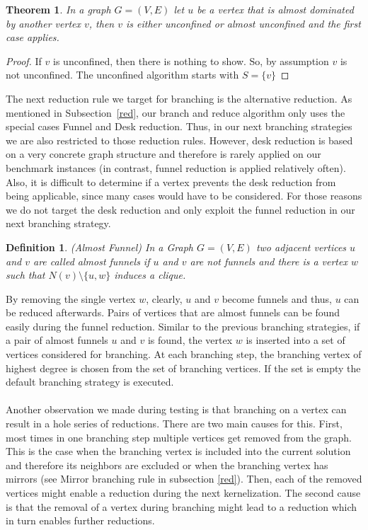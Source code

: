 \documentclass[]{article}
\newtheorem{theorem}{Theorem}
\newtheorem{definition}{Definition}
\begin{document}
\begin{theorem}
	In a graph $G=(V,E)$ let $u$ be a vertex that is almost dominated by another vertex $v$, then $v$ is either unconfined or almost unconfined and the first case applies.
\end{theorem}

\begin{proof}
	If $v$ is unconfined, then there is nothing to show. So, by assumption $v$ is not unconfined.
	The unconfined algorithm starts with $S=\{v\}$ 
\end{proof}

The next reduction rule we target for branching is the alternative reduction. As mentioned in Subsection~\ref{red}, our branch and reduce algorithm only uses the special cases Funnel and Desk reduction. Thus, in our next branching strategies we are also restricted to those reduction rules. However, desk reduction is based on a very concrete graph structure and therefore is rarely applied on our benchmark instances (in contrast, funnel reduction is applied relatively often). Also, it is difficult to determine if a vertex prevents the desk reduction from being applicable, since many cases would have to be considered.
For those reasons we do not target the desk reduction and only exploit the funnel reduction in our next branching strategy.
\begin{definition}(Almost Funnel)
	In a Graph $G=(V,E)$ two adjacent vertices $u$ and $v$ are called almost funnels if $u$ and $v$ are not funnels and there is a vertex $w$ such that $N(v)\setminus\{u,w\}$ induces a clique.
\end{definition}

By removing the single vertex $w$, clearly, $u$ and $v$ become funnels and thus, $u$ can be reduced afterwards. Pairs of vertices that are almost funnels can be found easily during the funnel reduction. Similar to the previous branching strategies, if a pair of almost funnels $u$ and $v$ is found, the vertex $w$ is inserted into a set of vertices considered for branching. At each branching step, the branching vertex of highest degree is chosen from the set of branching vertices. If the set is empty the default branching strategy is executed.

\paragraph{}

Another observation we made during testing is that branching on a vertex can result in a hole series of reductions. There are two main causes for this. First, most times in one branching step multiple vertices get removed from the graph. This is the case when the branching vertex is included into the current solution and therefore its neighbors are excluded or when the branching vertex has mirrors (see Mirror branching rule in subsection \ref{red}). Then, each of the removed vertices might enable a reduction during the next kernelization. The second cause is that the removal of a vertex during branching might lead to a reduction which in turn enables further reductions. 
\end{document}
